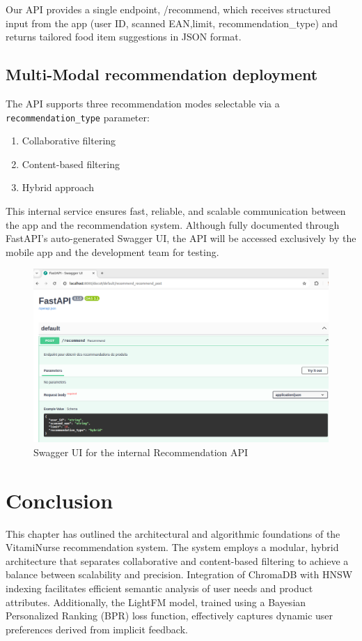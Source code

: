 \par Our API provides a single endpoint, /recommend, which receives structured input from the app (user ID, scanned EAN,limit, recommendation\_type) and returns tailored food item suggestions in JSON format.


\subsection{Multi-Modal recommendation deployment}
The API supports three recommendation modes selectable via a \texttt{recommendation\_type} parameter: 
\begin{enumerate}
    \item Collaborative filtering
    \item Content-based filtering
    \item Hybrid approach
\end{enumerate}

This internal service ensures fast, reliable, and scalable communication between the app and the recommendation system. Although fully documented through FastAPI’s auto-generated Swagger UI, the API will be accessed exclusively by the mobile app and the development team for testing.
 \begin{center}
    \begin{figure}[H]
        \includegraphics[scale=0.41]{images/swaggerFastAPI.png}
    \caption{Swagger UI for the internal Recommendation API} 
    \label{fig:swagger_UI}
\end{figure}
\end{center}

\section*{Conclusion}
This chapter has outlined the architectural and algorithmic foundations of the VitamiNurse recommendation system. 
The system employs a modular, hybrid architecture that separates collaborative and content-based filtering to achieve a balance between scalability and precision. 
Integration of ChromaDB with HNSW indexing facilitates efficient semantic analysis of user needs and product attributes. 
Additionally, the LightFM model, trained using a Bayesian Personalized Ranking (BPR) loss function, effectively captures dynamic user preferences derived from implicit feedback.


